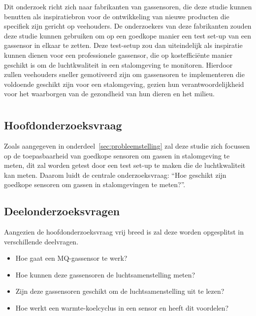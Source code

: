 Dit onderzoek richt zich naar fabrikanten van gassensoren, die deze studie kunnen benutten als inspiratiebron voor de ontwikkeling van nieuwe producten die specifiek zijn gericht op veehouders. De onderzoekers van deze fabrikanten zouden deze studie kunnen gebruiken om op een goedkope manier een test set-up van een gassensor in elkaar te zetten. Deze test-setup zou dan uiteindelijk als inspiratie kunnen dienen voor een professionele gassensor, die op kostefficiënte manier geschikt is om de luchtkwaliteit in een stalomgeving te monitoren. Hierdoor zullen veehouders sneller gemotiveerd zijn om gassensoren te implementeren die voldoende geschikt zijn voor een stalomgeving, gezien hun verantwoordelijkheid voor het waarborgen van de gezondheid van hun dieren en het milieu.



\section{}%
\label{sec:onderzoeksvraag}

\subsection{Hoofdonderzoeksvraag}%
Zoals aangegeven in onderdeel~\ref{sec:probleemstelling} zal deze studie zich focussen op de toepasbaarheid van goedkope sensoren om gassen in stalomgeving te meten, dit zal worden getest door een test set-up te maken die de luchtkwaliteit kan meten. Daarom luidt de centrale onderzoeksvraag: ``Hoe geschikt zijn goedkope sensoren om gassen in stalomgevingen te meten?''.

\subsection{Deelonderzoeksvragen}%
Aangezien de hoofdonderzoeksvraag vrij breed is zal deze worden opgesplitst in verschillende deelvragen.

\begin{itemize}
    \item Hoe gaat een MQ-gassensor te werk?
    \item Hoe kunnen deze gassensoren de luchtsamenstelling meten?
    \item Zijn deze gassensoren geschikt om de luchtsamenstelling uit te lezen?
    \item Hoe werkt een warmte-koelcyclus in een sensor en heeft dit voordelen?
\end{itemize}


